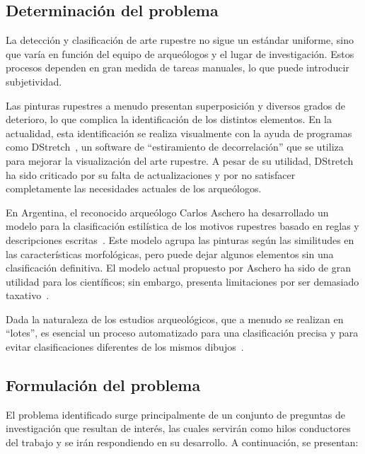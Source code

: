 \subsection{Determinación del problema}

La detección y clasificación de arte rupestre no sigue un estándar uniforme, sino que varía en función del equipo de arqueólogos y el lugar de investigación. Estos procesos dependen en gran medida de tareas manuales, lo que puede introducir subjetividad.

Las pinturas rupestres a menudo presentan superposición y diversos grados de deterioro, lo que complica la identificación de los distintos elementos. En la actualidad, esta identificación se realiza visualmente con la ayuda de programas como DStretch~\cite{dstretch}, un software de ``estiramiento de decorrelación'' que se utiliza para mejorar la visualización del arte rupestre. A pesar de su utilidad, DStretch ha sido criticado por su falta de actualizaciones y por no satisfacer completamente las necesidades actuales de los arqueólogos.

En Argentina, el reconocido arqueólogo Carlos Aschero ha desarrollado un modelo para la clasificación estilística de los motivos rupestres basado en reglas y descripciones escritas~\cite{aschero2012}. Este modelo agrupa las pinturas según las similitudes en las características morfológicas, pero puede dejar algunos elementos sin una clasificación definitiva. El modelo actual propuesto por Aschero ha sido de gran utilidad para los científicos; sin embargo, presenta limitaciones por ser demasiado taxativo~\cite{aschero2000}.

Dada la naturaleza de los estudios arqueológicos, que a menudo se realizan en ``lotes'', es esencial un proceso automatizado para una clasificación precisa y para evitar clasificaciones diferentes de los mismos dibujos~\cite{aschero1998}.

\subsection{Formulación del problema}

El problema identificado surge principalmente de un conjunto de preguntas de investigación que resultan de interés, las cuales servirán como hilos conductores del trabajo y se irán respondiendo en su desarrollo. A continuación, se presentan:

